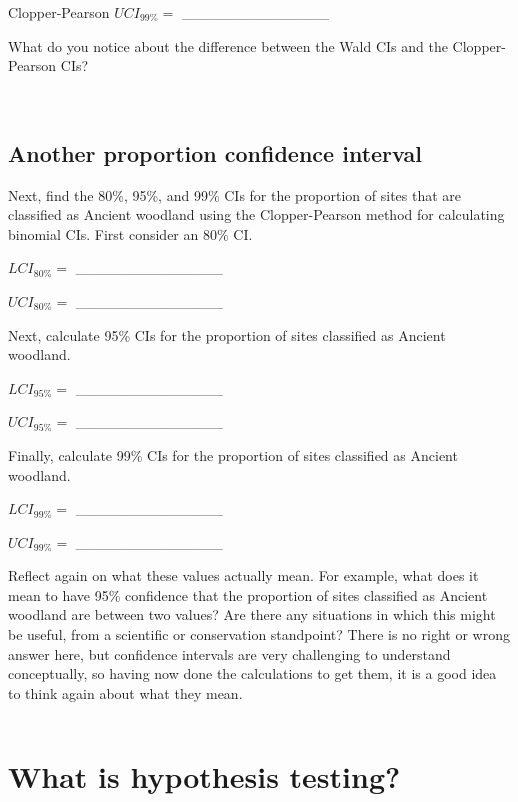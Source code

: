 \documentclass[
  openany]{krantz}
\begin{document}
Clopper-Pearson \(UCI_{99\%} =\) \_\_\_\_\_\_\_\_\_\_\_\_\_\_

What do you notice about the difference between the Wald CIs and the Clopper-Pearson CIs?

\begin{verbatim}


\end{verbatim}

\hypertarget{another-proportion-confidence-interval}{%
\section{Another proportion confidence interval}\label{another-proportion-confidence-interval}}

Next, find the 80\%, 95\%, and 99\% CIs for the proportion of sites that are classified as Ancient woodland using the Clopper-Pearson method for calculating binomial CIs.
First consider an 80\% CI.

\(LCI_{80\%} =\) \_\_\_\_\_\_\_\_\_\_\_\_\_\_

\(UCI_{80\%} =\) \_\_\_\_\_\_\_\_\_\_\_\_\_\_

Next, calculate 95\% CIs for the proportion of sites classified as Ancient woodland.

\(LCI_{95\%} =\) \_\_\_\_\_\_\_\_\_\_\_\_\_\_

\(UCI_{95\%} =\) \_\_\_\_\_\_\_\_\_\_\_\_\_\_

Finally, calculate 99\% CIs for the proportion of sites classified as Ancient woodland.

\(LCI_{99\%} =\) \_\_\_\_\_\_\_\_\_\_\_\_\_\_

\(UCI_{99\%} =\) \_\_\_\_\_\_\_\_\_\_\_\_\_\_

Reflect again on what these values actually mean.
For example, what does it mean to have 95\% confidence that the proportion of sites classified as Ancient woodland are between two values?
Are there any situations in which this might be useful, from a scientific or conservation standpoint?
There is no right or wrong answer here, but confidence intervals are very challenging to understand conceptually, so having now done the calculations to get them, it is a good idea to think again about what they mean.

\begin{verbatim}

\end{verbatim}

\hypertarget{Chapter_21}{%
\chapter{What is hypothesis testing?}\label{Chapter_21}}
\end{document}
